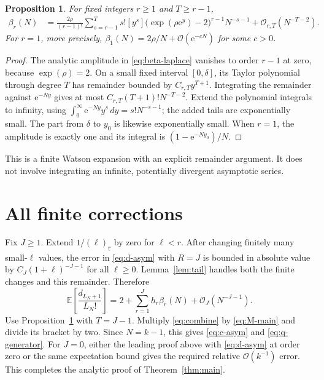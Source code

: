 \documentclass[11pt,letterpaper]{article}
\numberwithin{equation}{section}
\newtheorem{proposition}[theorem]{Proposition}
\theoremstyle{remark}\newtheorem{remark}[theorem]{Remark}
\newcommand{\E}{\mathbb E}
\newcommand{\e}{\mathrm e}
\newcommand{\Ord}{\mathcal O}
\newcommand{\fall}[2]{(#1)_{\underline{#2}}}
\begin{document}
\begin{proposition}\label{prop:moment}
For fixed integers $r\ge1$ and $T\ge r-1$,
\begin{align}\label{eq:beta-expansion}
 \beta_r(N)
 &=\frac{2\rho}{(r-1)!}\sum_{s=r-1}^{T}s!
       [y^s]\bigl(\exp(\rho\e^y)-2\bigr)^{r-1}N^{-s-1}
       +\Ord_{r,T}(N^{-T-2}).
\end{align}
For $r=1$, more precisely, $\beta_1(N)=2\rho/N+\Ord(\e^{-cN})$ for some $c>0$.
\end{proposition}
\begin{proof}
The analytic amplitude in \eqref{eq:beta-laplace} vanishes to order $r-1$ at zero, because $\exp(\rho)=2$. On a small fixed interval $[0,\delta]$, its Taylor polynomial through degree $T$ has remainder bounded by $C_{r,T}y^{T+1}$. Integrating the remainder against $\e^{-Ny}$ gives at most $C_{r,T}(T+1)!N^{-T-2}$. Extend the polynomial integrals to infinity, using $\int_0^\infty\e^{-Ny}y^s\,dy=s!N^{-s-1}$; the added tails are exponentially small. The part from $\delta$ to $y_0$ is likewise exponentially small. When $r=1$, the amplitude is exactly one and its integral is $(1-\e^{-Ny_0})/N$.
\end{proof}
This is a finite Watson expansion with an explicit remainder argument. It does not involve integrating an infinite, potentially divergent asymptotic series.

\section{All finite corrections}
\label{sec:corrections}
Fix $J\ge1$. Extend $1/\fall{\ell}{r}$ by zero for $\ell<r$. After changing finitely many small-$\ell$ values, the error in \eqref{eq:d-asym} with $R=J$ is bounded in absolute value by $C_J(1+\ell)^{-J-1}$ for all $\ell\ge0$. Lemma~\ref{lem:tail} handles both the finite changes and this remainder. Therefore
\begin{equation}\label{eq:combine}
 \E\left[\frac{d_{L_N+1}}{L_N!}\right]
 =2+\sum_{r=1}^{J}h_r\beta_r(N)+\Ord_J(N^{-J-1}).
\end{equation}
Use Proposition~\ref{prop:moment} with $T=J-1$. Multiply \eqref{eq:combine} by \eqref{eq:M-main} and divide its bracket by two. Since $N=k-1$, this gives \eqref{eq:c-asym} and \eqref{eq:q-generator}. For $J=0$, either the leading proof above with \eqref{eq:d-asym} at order zero or the same expectation bound gives the required relative $\Ord(k^{-1})$ error. This completes the analytic proof of Theorem~\ref{thm:main}.
\end{document}
